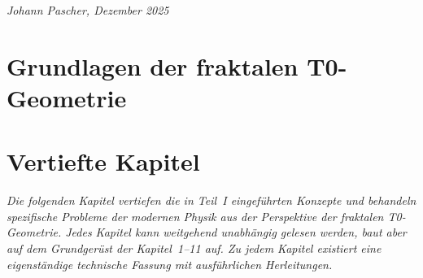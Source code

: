 \documentclass[11pt,openright,twoside]{book}
\begin{document}
\vfill
\textit{Johann Pascher, Dezember 2025}

\newpage


\part{Grundlagen der fraktalen T0-Geometrie}













\part{Vertiefte Kapitel}

\noindent\textit{Die folgenden Kapitel vertiefen die in Teil~I eingeführten Konzepte und behandeln spezifische Probleme der modernen Physik aus der Perspektive der fraktalen T0-Geometrie. Jedes Kapitel kann weitgehend unabhängig gelesen werden, baut aber auf dem Grundgerüst der Kapitel~1--11 auf. Zu jedem Kapitel existiert eine eigenständige technische Fassung mit ausführlichen Herleitungen.}

\vspace{1cm}
































\end{document}
